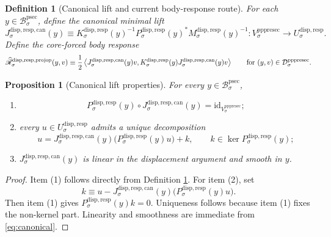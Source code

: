 \documentclass[11pt]{article}
\newcommand{\ProtoSectionBody}[1]{\mathcal B_{#1}^{\mathrm{psec}}}
\newcommand{\PrePreProtoSectionVertical}[1]{V_{#1}^{\mathrm{pppresec}}}
\newcommand{\PrePreProtoSectionResidualBody}[1]{\mathcal D_{#1}^{\mathrm{pppresec}}}
\newcommand{\SubstrateCarrier}[1]{U_{#1}^{\mathrm{disp,resp}}}
\newcommand{\SubstrateProjection}[1]{P_{#1}^{\mathrm{disp,resp}}}
\newcommand{\SubstrateOperator}[1]{K_{#1}^{\mathrm{disp,resp}}}
\newcommand{\SchurResponse}[1]{M_{#1}^{\mathrm{disp,resp}}}
\newcommand{\CanonicalLift}[1]{J_{#1}^{\mathrm{disp,resp,can}}}
\newcommand{\CoreForcedBodyResponse}[1]{\widehat{\mathscr R}_{#1}^{\mathrm{disp,resp,projop}}}
\newtheorem{definition}{Definition}
\newtheorem{proposition}{Proposition}
\begin{document}
\begin{definition}[Canonical lift and current body-response route]
\label{def:canonical}
For each \(y\in\ProtoSectionBody{\sigma}\), define the \emph{canonical minimal lift}
\begin{equation}
\CanonicalLift{\sigma}(y)
\equiv
\SubstrateOperator{\sigma}(y)^{-1}\SubstrateProjection{\sigma}(y)^*
\SchurResponse{\sigma}(y)^{-1}
:
\PrePreProtoSectionVertical{\sigma}\to\SubstrateCarrier{\sigma}.
\label{eq:canonical}
\end{equation}
Define the \emph{core-forced body response}
\begin{equation}
\CoreForcedBodyResponse{\sigma}(y,v)
\equiv
\frac{1}{2}
\ev{
\CanonicalLift{\sigma}(y)v,
\SubstrateOperator{\sigma}(y)\CanonicalLift{\sigma}(y)v
}
\qquad
\text{for }
(y,v)\in\PrePreProtoSectionResidualBody{\sigma}.
\label{eq:coreresponse}
\end{equation}
\end{definition}

\begin{proposition}[Canonical lift properties]
\label{prop:canonical}
For every \(y\in\ProtoSectionBody{\sigma}\),
\begin{enumerate}
    \item
    \[
    \SubstrateProjection{\sigma}(y)\circ\CanonicalLift{\sigma}(y)
    =
    \mathrm{id}_{\PrePreProtoSectionVertical{\sigma}};
    \]
    \item every \(u\in\SubstrateCarrier{\sigma}\) admits a unique decomposition
    \[
    u
    =
    \CanonicalLift{\sigma}(y)\bigl(\SubstrateProjection{\sigma}(y)u\bigr)
    +
    k,
    \qquad
    k\in\ker\SubstrateProjection{\sigma}(y);
    \]
    \item \(\CanonicalLift{\sigma}(y)\) is linear in the displacement argument and smooth in \(y\).
\end{enumerate}
\end{proposition}

\begin{proof}
Item (1) follows directly from Definition \ref{def:canonical}. For item (2), set
\[
k
\equiv
u-\CanonicalLift{\sigma}(y)\bigl(\SubstrateProjection{\sigma}(y)u\bigr).
\]
Then item (1) gives \(\SubstrateProjection{\sigma}(y)k=0\). Uniqueness follows because item (1) fixes the non-kernel part. Linearity and smoothness are immediate from \eqref{eq:canonical}.
\end{proof}
\end{document}
